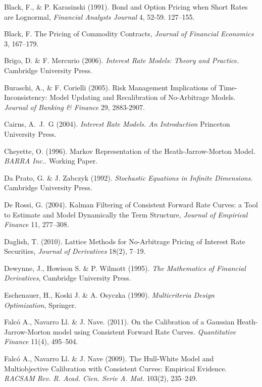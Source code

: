 \begin{thebibliography}{}
  {\sc Black, F., \& P. Karasinski (1991).} Bond and Option Pricing when
Short Rates are Lognormal, \emph{Financial Analysts Journal} 4, 52-59.
  127--155.  

{\sc Black, F.}  The Pricing of Commodity Contracts, \emph{Journal of
  Financial Economics} 3, 167--179.

{\sc Brigo, D. \& F. Mercurio (2006).} \emph{Interest Rate Models:
  Theory and Practice.} Cambridge University Press. 

{\sc Buraschi, A., \& F. Corielli (2005).} Risk Management
Implications of Time-Inconsistency: Model Updating and Recalibration
of No-Arbitrage Models. \emph{Journal of Banking \& Finance} 29, 2883-2907.

{\sc Cairns, A.~J.~G (2004).} \emph{Interest Rate Models. An
  Introduction} Princeton University Press. 

{\sc Cheyette, O. (1996).} Markov Representation of the
Heath-Jarrow-Morton Model. \emph{BARRA Inc.}. Working Paper.

{\sc Da Prato, G. \& J. Zabczyk  (1992).} \emph{Stochastic Equations in Infinite
  Dimensions.} Cambridge University Press.

{\sc De Rossi, G. (2004).} Kalman Filtering of Consistent Forward
Rate Curves: a Tool to Estimate and Model Dynamically the Term
Structure, \emph{Journal of Empirical Finance} 11, 277--308.  

{\sc Daglish, T. (2010).}
Lattice Methods for No-Arbitrage Pricing of Interest Rate Securities,
\emph{Journal of Derivatives} 18(2), 7--19.  

{\sc Dewynne, J., Howison S. \& P. Wilmott (1995).}
\emph{The Mathematics of Financial Derivatives}, Cambridge University
Press.    

{\sc Eschenauer, H., Koski J. \& A. Osyczka (1990).} 
\emph{Multicriteria Design Optimization}, Springer.  


{\sc Falc\'o A., Navarro Ll. \& J. Nave. (2011).} On the Calibration of a Gaussian
Heath-Jarrow-Morton model using Consistent Forward Rate
Curves. \emph{Quantitative Finance} 11(4), 495--504. 

{\sc Falc\'o A., Navarro Ll. \& J. Nave (2009).} The Hull-White Model
and Multiobjective Calibration with Consistent Curves: Empirical
Evidence. \emph{RACSAM Rev. R. Acad. Cien. Serie A. Mat.} 103(2), 235--249.  


\end{thebibliography}
